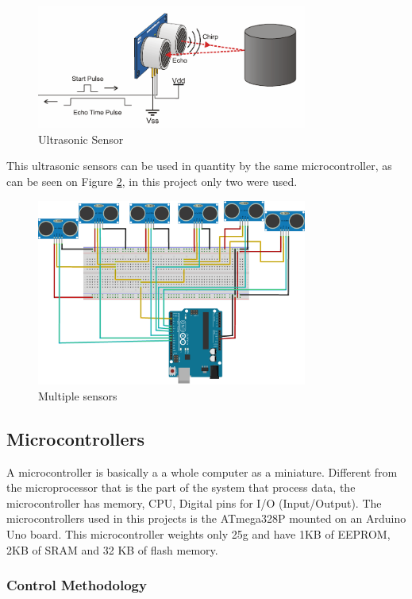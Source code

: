 \documentclass[transmag]{IEEEtran}
\begin{document}
\begin{figure}
\centerline{\includegraphics[width=3.5in]{./images/Ultrasonic}}
\caption{Ultrasonic Sensor\label{Ultrasonic}}
\end{figure}

This ultrasonic sensors can be used in quantity by the same microcontroller, as can be seen on Figure \ref{multiplesensors}, in this project only two were used.

\begin{figure}[h]
\centerline{\includegraphics[width=3.5in]{./images/multiplesensors}}
\caption{Multiple sensors\label{multiplesensors}}
\end{figure}



\subsection{Microcontrollers}

A microcontroller is basically a a whole computer as a miniature. Different from the microprocessor that is the part of the system that process data, the microcontroller has memory, CPU, Digital pins for I/O (Input/Output). 
The microcontrollers used in this projects is the ATmega328P mounted on an Arduino Uno board. This microcontroller weights only 25g and have 1KB of EEPROM, 2KB of SRAM and 32 KB of flash memory. \cite{ref5}


\subsubsection{Control Methodology}
\end{document}
